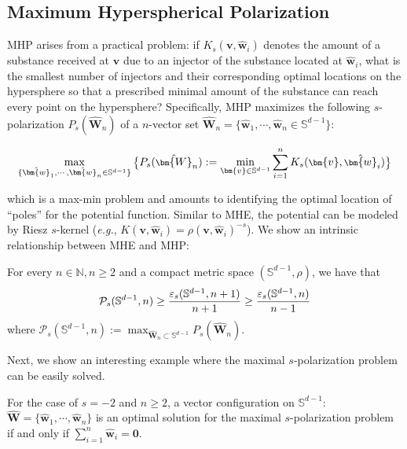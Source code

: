 \subsection{Maximum Hyperspherical Polarization}

MHP arises from a practical problem: if $K_s(\bm{v},\hat{\bm{w}}_i)$ denotes the amount of a substance received at $\bm{v}$ due to an injector of the substance located at $\hat{\bm{w}}_i$, what is the smallest number of injectors and their corresponding optimal locations on the hypersphere so that a prescribed minimal amount of the substance can reach every point on the hypersphere? Specifically, MHP maximizes the following $s$-polarization $P_s(\hat{\bm{W}}_n)$ of a $n$-vector set $\hat{\bm{W}}_n=\{\hat{\bm{w}}_1,\cdots,\hat{\bm{w}}_n\in\mathbb{S}^{d-1}\}$:

\begin{equation}
\footnotesize
    \max_{\{\hat{\bm{w}}_1,\cdots,\hat{\bm{w}}_n\in\mathbb{S}^{d-1}\}}\big{\{}P_s(\hat{\bm{W}}_n):=\min_{\bm{v}\in\mathbb{S}^{d-1}}\sum_{i=1}^nK_s(\bm{v},\hat{\bm{w}}_i)\big{\}}
\end{equation}

which is a max-min problem and amounts to identifying the optimal location of ``poles'' for the potential function. Similar to MHE, the potential can be modeled by Riesz $s$-kernel (\emph{e.g.}, $K(\bm{v},\hat{\bm{w}}_i)=\rho(\bm{v},\hat{\bm{w}}_i)^{-s}$). We show an intrinsic relationship between MHE and MHP:

\begin{proposition}\label{mhp}
For every $n\in\mathbb{N}, n\geq 2$ and a compact metric space $(\mathbb{S}^{d-1},\rho)$, we have that
\begin{equation}
\footnotesize
    \mathcal{P}_s(\mathbb{S}^{d-1},n)\geq\frac{\varepsilon_s(\mathbb{S}^{d-1},n+1)}{n+1}\geq\frac{\varepsilon_s(\mathbb{S}^{d-1},n)}{n-1}
\end{equation}
where $\mathcal{P}_s(\mathbb{S}^{d-1},n):=\max_{\hat{\bm{W}}_n\subset\mathbb{S}^{d-1}}P_s(\hat{\bm{W}}_n)$.
\end{proposition}

Next, we show an interesting example where the maximal $s$-polarization problem can be easily solved.

\begin{proposition}\label{mhp_relax}
For the case of $s=-2$ and $n\geq 2$, a vector configuration on $\mathbb{S}^{d-1}$: $\hat{\bm{W}}=\{\hat{\bm{w}}_1,\cdots,\hat{\bm{w}}_n\}$ is an optimal solution for the maximal $s$-polarization problem if and only if $\sum_{i=1}^n\hat{\bm{w}}_i=\bm{0}$.
\end{proposition}

